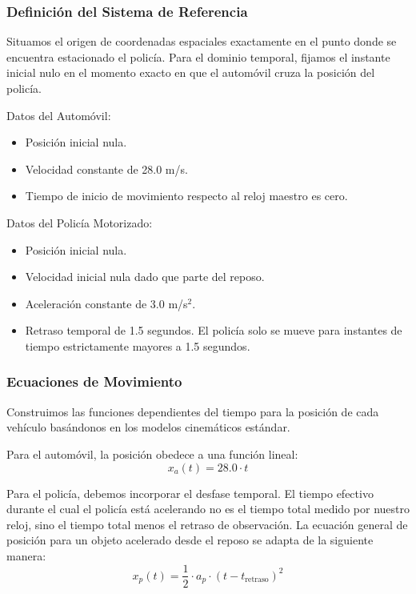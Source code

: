 \documentclass[12pt, a4paper]{article}
\begin{document}
\subsubsection*{Definición del Sistema de Referencia}

Situamos el origen de coordenadas espaciales exactamente en el punto donde se encuentra estacionado el policía. Para el dominio temporal, fijamos el instante inicial nulo en el momento exacto en que el automóvil cruza la posición del policía. 

Datos del Automóvil:
\begin{itemize}
    \item Posición inicial nula.
    \item Velocidad constante de 28.0 m/s.
    \item Tiempo de inicio de movimiento respecto al reloj maestro es cero.
\end{itemize}

Datos del Policía Motorizado:
\begin{itemize}
    \item Posición inicial nula.
    \item Velocidad inicial nula dado que parte del reposo.
    \item Aceleración constante de 3.0 m/s$^2$.
    \item Retraso temporal de 1.5 segundos. El policía solo se mueve para instantes de tiempo estrictamente mayores a 1.5 segundos.
\end{itemize}

\subsubsection*{Ecuaciones de Movimiento}

Construimos las funciones dependientes del tiempo para la posición de cada vehículo basándonos en los modelos cinemáticos estándar.

Para el automóvil, la posición obedece a una función lineal:
\begin{equation}
x_a(t) = 28.0 \cdot t
\end{equation}

Para el policía, debemos incorporar el desfase temporal. El tiempo efectivo durante el cual el policía está acelerando no es el tiempo total medido por nuestro reloj, sino el tiempo total menos el retraso de observación. La ecuación general de posición para un objeto acelerado desde el reposo se adapta de la siguiente manera:
\begin{equation}
x_p(t) = \frac{1}{2} \cdot a_p \cdot (t - t_{\text{retraso}})^2
\end{equation}
\end{document}
